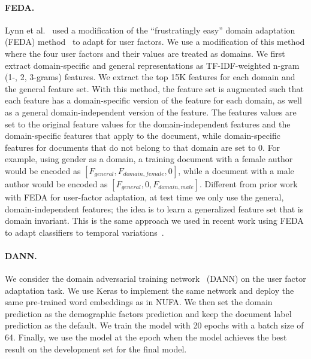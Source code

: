 \paragraph{FEDA.} Lynn et al.~\cite{lynn2017human} used a modification of the ``frustratingly easy'' domain adaptation (FEDA) method~\cite{daume2007frustratingly} to adapt for user factors. 
We use a modification of this method where the four user factors and their values are treated as domains.
We first extract domain-specific and general representations as TF-IDF-weighted n-gram (1-, 2, 3-grams) features. We extract the top 15K features for each domain and the general feature set.
With this method, the feature set is augmented such that each feature has a domain-specific version of the feature for each domain, as well as a general domain-independent version of the feature.
The features values are set to the original feature values for the domain-independent features and the domain-specific features that apply to the document, while domain-specific features for documents that do not belong to that domain are set to $0$.
For example, using gender as a domain, a training document with a female author would be encoded as $[F_{general}, F_{domain, female}, 0]$, while a document with a male author would be encoded as $[F_{general}, 0, F_{domain, male}]$.
Different from prior work with FEDA for user-factor adaptation, 
at test time we only use the general, domain-independent features;
the idea is to learn a generalized feature set that is domain invariant.
This is the same approach we used in recent work using FEDA to adapt classifiers to temporal variations~\cite{huang2018examining}.



\paragraph{DANN.} We consider the domain adversarial training network~\cite{ganin2016domain} (DANN) on the user factor adaptation task. We use Keras to implement the same network and deploy the same pre-trained word embeddings as in NUFA. We then set the domain prediction as the demographic factors prediction and keep the document label prediction as the default. We train the model with 20 epochs with a batch size of 64. Finally, we use the model at the epoch when the model achieves the best result on the development set for the final model.


